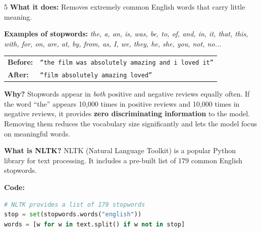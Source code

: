 \documentclass[12pt, a4paper]{article}
\begin{document}
\begin{stepbox}{5}
\textbf{What it does:} Removes extremely common English words that carry little meaning.

\medskip
\textbf{Examples of stopwords:} \textit{the, a, an, is, was, be, to, of, and, in, it, that, this, with, for, on, are, at, by, from, as, I, we, they, he, she, you, not, no...}

\medskip
\begin{center}
\begin{tabular}{ll}
\textbf{Before:} & \texttt{``the film was absolutely amazing and i loved it''} \\
\textbf{After:}  & \texttt{``film absolutely amazing loved''} \\
\end{tabular}
\end{center}

\medskip
\textbf{Why?} Stopwords appear in \emph{both} positive and negative reviews equally often. If the word ``the'' appears 10{,}000 times in positive reviews and 10{,}000 times in negative reviews, it provides \textbf{zero discriminating information} to the model. Removing them reduces the vocabulary size significantly and lets the model focus on meaningful words.

\medskip
\textbf{What is NLTK?} NLTK (Natural Language Toolkit) is a popular Python library for text processing. It includes a pre-built list of 179 common English stopwords.

\medskip
\textbf{Code:}
\begin{lstlisting}[language=Python]
# NLTK provides a list of 179 stopwords
stop = set(stopwords.words("english"))
words = [w for w in text.split() if w not in stop]
\end{lstlisting}
\end{stepbox}
\end{document}
